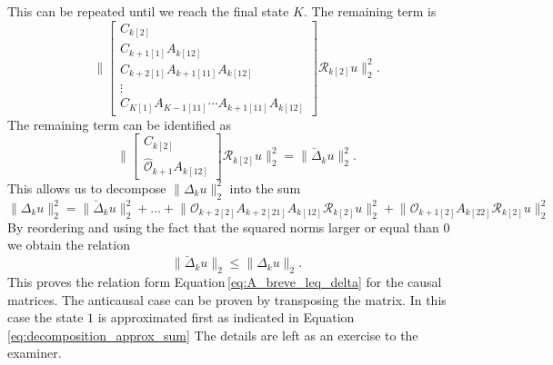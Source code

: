 \documentclass[numbers=noenddot,doctype=mastersthesis,BCOR=15mm,biblatex]{ldvbook}%
\newcommand{\R}{\mathcal{R}} %
\newcommand{\Ob}{\mathcal{O}} %
\begin{document}
This can be repeated until we reach the final state $K$.
The remaining term is 
\begin{equation}
	\Bigg\|
	\begin{bmatrix}
	C_{k[2]}\\
	C_{k+1[1]}A_{k[12]}\\
	C_{k+2[1]}A_{k+1[11]}A_{k[12]}\\
	\vdots\\
	C_{K[1]}A_{K-1[11]}\cdots  A_{k+1[11]} A_{k[12]}
	\end{bmatrix}  \R_{k[2]} u
	\Bigg\|_2^2
	.
\end{equation}
The remaining term can be identified as 
\begin{equation}
\Bigg\|
\begin{bmatrix}
C_{k[2]}\\
\hat{\Ob}_{k+1}A_{k[12]}
\end{bmatrix}  \R_{k[2]} u
\Bigg\|_2^2
=
\Big\|\breve{\Delta}_k u\Big\|_2^2
.
\end{equation}
This allows us to decompose $\|\Delta_k u\|_2^2$ into the sum
\begin{equation*}
\|\Delta_k u\|_2^2
	  =
	    \|\breve{\Delta}_k u\|_2^2
	  + \dots +
	  \Big\|
	  \Ob_{k+2[2]}A_{k+2[21]}A_{k[12]}
	  \R_{k[2]} u
	  \Big\|_2^2
	  + \Big\|
	  \Ob_{k+1[2]}A_{k[22]}
	  \R_{k[2]} u
	  \Big\|_2^2
\end{equation*}
By reordering and using the fact that the squared norms larger or equal than $0$ we obtain the relation
\begin{equation}
	\|\breve{\Delta}_k u\|_2 \leq \|\Delta_k u\|_2 
	.
\end{equation}
This proves the relation form Equation\,\ref{eq:A_breve_leq_delta} for the causal matrices.
The anticausal case can be proven by transposing the matrix.
In this case the state $1$ is approximated first as indicated in Equation\,\ref{eq:decomposition_approx_sum}
The details are left as an exercise to the examiner.
\end{document}
